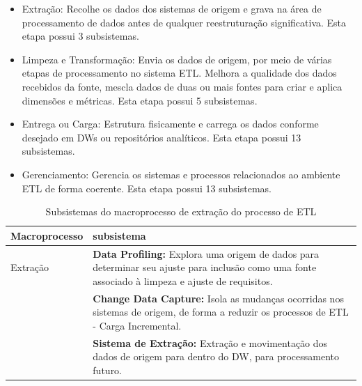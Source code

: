 \begin{itemize}
	\item Extração: Recolhe os dados dos sistemas de origem e grava na área de processamento de dados antes de qualquer reestruturação significativa. Esta etapa possui 3 subsistemas.
	
	\item Limpeza e Transformação: Envia os dados de origem, por meio de várias etapas de processamento no sistema ETL. Melhora a qualidade dos dados recebidos da fonte, mescla dados de duas ou mais fontes para criar e aplica dimensões e métricas. Esta etapa possui 5 subsistemas.
	
	\item Entrega ou Carga: Estrutura fisicamente e carrega os dados conforme desejado em DWs ou repositórios analíticos. Esta etapa possui 13 subsistemas.
	
	\item Gerenciamento: Gerencia os sistemas e processos relacionados ao ambiente ETL de forma coerente. Esta etapa possui 13 subsistemas.
\end{itemize}
\clearpage

\begin{table}[h]
	\centering
	\caption{Subsistemas do macroprocesso de extração do processo de ETL}
	\label{subextracao}
	\begin{tabular}{|p{3cm}| p{11cm} |}
	\hline
	Macroprocesso & subsistema\\
	\hline
	Extração & \textbf{Data Profiling:} Explora uma origem de dados para determinar seu ajuste para inclusão como uma fonte associado à limpeza e ajuste de requisitos.\\
	&  \textbf{Change Data Capture:} Isola as mudanças ocorridas nos sistemas de origem, de forma a reduzir os processos de ETL - Carga Incremental.\\
	& \textbf{Sistema de Extração:} Extração e movimentação dos dados de origem para dentro do DW, para processamento futuro.\\
	\hline	
		
	\end{tabular}
\end{table}

